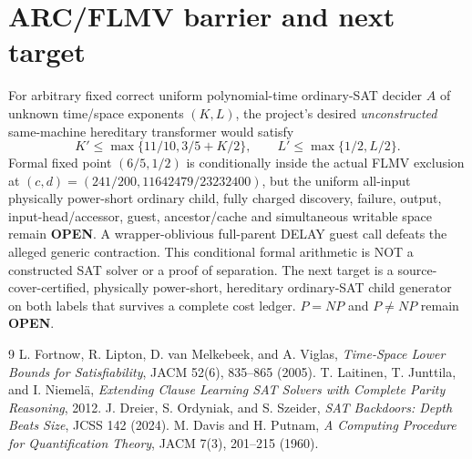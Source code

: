 \documentclass[11pt]{article}
\begin{document}
\section{ARC/FLMV barrier and next target}
For arbitrary fixed correct uniform polynomial-time ordinary-SAT decider $A$ of unknown time/space exponents $(K,L)$, the project's desired \emph{unconstructed} same-machine hereditary transformer would satisfy
\[
K'\le\max\{11/10,3/5+K/2\},\qquad L'\le\max\{1/2,L/2\}.
\]
Formal fixed point $(6/5,1/2)$ is conditionally inside the actual FLMV exclusion at $(c,d)=(241/200,11642479/23232400)$, but the uniform all-input physically power-short ordinary child, fully charged discovery, failure, output, input-head/accessor, guest, ancestor/cache and simultaneous writable space remain \textbf{OPEN}. A wrapper-oblivious full-parent DELAY guest call defeats the alleged generic contraction. This conditional formal arithmetic is NOT a constructed SAT solver or a proof of separation. The next target is a source-cover-certified, physically power-short, hereditary ordinary-SAT child generator on both labels that survives a complete cost ledger. $P=NP$ and $P\ne NP$ remain \textbf{OPEN}.
\begin{thebibliography}{9}
 L. Fortnow, R. Lipton, D. van Melkebeek, and A. Viglas, \emph{Time-Space Lower Bounds for Satisfiability}, JACM 52(6), 835--865 (2005).
 T. Laitinen, T. Junttila, and I. Niemel\"a, \emph{Extending Clause Learning SAT Solvers with Complete Parity Reasoning}, 2012.
 J. Dreier, S. Ordyniak, and S. Szeider, \emph{SAT Backdoors: Depth Beats Size}, JCSS 142 (2024).
 M. Davis and H. Putnam, \emph{A Computing Procedure for Quantification Theory}, JACM 7(3), 201--215 (1960).
\end{thebibliography}
\end{document}
